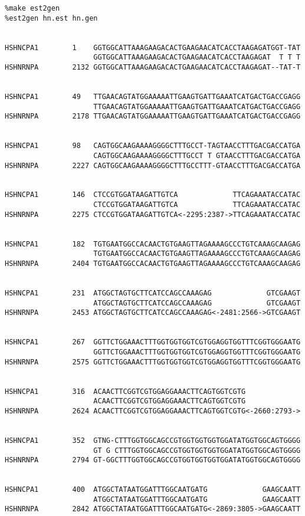 \begin{verbatim}
%make est2gen
%est2gen hn.est hn.gen


HSHNCPA1        1    GGTGGCATTAAAGAAGACACTGAAGAACATCACCTAAGAGATGGT-TAT 
                     GGTGGCATTAAAGAAGACACTGAAGAACATCACCTAAGAGAT  T T T 
HSHNRNPA        2132 GGTGGCATTAAAGAAGACACTGAAGAACATCACCTAAGAGAT--TAT-T 


HSHNCPA1        49   TTGAACAGTATGGAAAAATTGAAGTGATTGAAATCATGACTGACCGAGG 
                     TTGAACAGTATGGAAAAATTGAAGTGATTGAAATCATGACTGACCGAGG 
HSHNRNPA        2178 TTGAACAGTATGGAAAAATTGAAGTGATTGAAATCATGACTGACCGAGG 


HSHNCPA1        98   CAGTGGCAAGAAAAGGGGCTTTGCCT-TAGTAACCTTTGACGACCATGA 
                     CAGTGGCAAGAAAAGGGGCTTTGCCT T GTAACCTTTGACGACCATGA 
HSHNRNPA        2227 CAGTGGCAAGAAAAGGGGCTTTGCCTTT-GTAACCTTTGACGACCATGA 


HSHNCPA1        146  CTCCGTGGATAAGATTGTCA             TTCAGAAATACCATAC 
                     CTCCGTGGATAAGATTGTCA             TTCAGAAATACCATAC 
HSHNRNPA        2275 CTCCGTGGATAAGATTGTCA<-2295:2387->TTCAGAAATACCATAC 


HSHNCPA1        182  TGTGAATGGCCACAACTGTGAAGTTAGAAAAGCCCTGTCAAAGCAAGAG 
                     TGTGAATGGCCACAACTGTGAAGTTAGAAAAGCCCTGTCAAAGCAAGAG 
HSHNRNPA        2404 TGTGAATGGCCACAACTGTGAAGTTAGAAAAGCCCTGTCAAAGCAAGAG 


HSHNCPA1        231  ATGGCTAGTGCTTCATCCAGCCAAAGAG             GTCGAAGT 
                     ATGGCTAGTGCTTCATCCAGCCAAAGAG             GTCGAAGT 
HSHNRNPA        2453 ATGGCTAGTGCTTCATCCAGCCAAAGAG<-2481:2566->GTCGAAGT 


HSHNCPA1        267  GGTTCTGGAAACTTTGGTGGTGGTCGTGGAGGTGGTTTCGGTGGGAATG 
                     GGTTCTGGAAACTTTGGTGGTGGTCGTGGAGGTGGTTTCGGTGGGAATG 
HSHNRNPA        2575 GGTTCTGGAAACTTTGGTGGTGGTCGTGGAGGTGGTTTCGGTGGGAATG 


HSHNCPA1        316  ACAACTTCGGTCGTGGAGGAAACTTCAGTGGTCGTG              
                     ACAACTTCGGTCGTGGAGGAAACTTCAGTGGTCGTG              
HSHNRNPA        2624 ACAACTTCGGTCGTGGAGGAAACTTCAGTGGTCGTG<-2660:2793-> 


HSHNCPA1        352  GTNG-CTTTGGTGGCAGCCGTGGTGGTGGTGGATATGGTGGCAGTGGGG 
                     GT G CTTTGGTGGCAGCCGTGGTGGTGGTGGATATGGTGGCAGTGGGG 
HSHNRNPA        2794 GT-GGCTTTGGTGGCAGCCGTGGTGGTGGTGGATATGGTGGCAGTGGGG 


HSHNCPA1        400  ATGGCTATAATGGATTTGGCAATGATG             GAAGCAATT 
                     ATGGCTATAATGGATTTGGCAATGATG             GAAGCAATT 
HSHNRNPA        2842 ATGGCTATAATGGATTTGGCAATGATG<-2869:3805->GAAGCAATT 



\end{verbatim}
